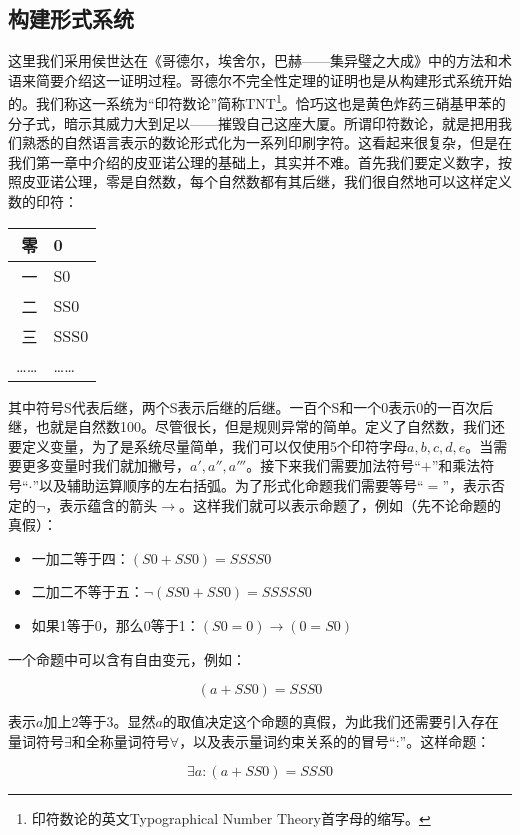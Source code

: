 \documentclass{article}
\begin{document}
\subsection{构建形式系统}
 
这里我们采用侯世达在《哥德尔，埃舍尔，巴赫——集异璧之大成》中的方法和术语来简要介绍这一证明过程。哥德尔不完全性定理的证明也是从构建形式系统开始的。我们称这一系统为“印符数论”简称TNT\footnote{印符数论的英文Typographical Number Theory首字母的缩写。}。恰巧这也是黄色炸药三硝基甲苯的分子式，暗示其威力大到足以——摧毁自己这座大厦。所谓印符数论，就是把用我们熟悉的自然语言表示的数论形式化为一系列印刷字符。这看起来很复杂，但是在我们第一章中介绍的皮亚诺公理的基础上，其实并不难。首先我们要定义数字，按照皮亚诺公理，零是自然数，每个自然数都有其后继，我们很自然地可以这样定义数的印符：

\begin{tabular}{|r|l|}
零 & 0 \\
\hline
一 & S0 \\
\hline
二 & SS0 \\
\hline
三 & SSS0 \\
\hline
…… & …… \\
\end{tabular}

其中符号S代表后继，两个S表示后继的后继。一百个S和一个0表示0的一百次后继，也就是自然数100。尽管很长，但是规则异常的简单。定义了自然数，我们还要定义变量，为了是系统尽量简单，我们可以仅使用5个印符字母$a, b, c, d, e$。当需要更多变量时我们就加撇号，$a', a'', a'''$。接下来我们需要加法符号“$+$”和乘法符号“$\cdot$”以及辅助运算顺序的左右括弧。为了形式化命题我们需要等号“$=$”，表示否定的$\lnot$，表示蕴含的箭头$\to$。这样我们就可以表示命题了，例如（先不论命题的真假）：

\begin{itemize}
\item 一加二等于四：$(S0 + SS0) = SSSS0$
\item 二加二不等于五：$\lnot (SS0 + SS0) = SSSSS0$
\item 如果1等于0，那么0等于1：$(S0 = 0) \to (0 = S0)$
\end{itemize}

一个命题中可以含有自由变元，例如：

\[
(a + SS0) = SSS0
\]

表示$a$加上2等于3。显然$a$的取值决定这个命题的真假，为此我们还需要引入存在量词符号$\exists$和全称量词符号$\forall$，以及表示量词约束关系的的冒号“:”。这样命题：

\[
\exists a : (a + SS0) = SSS0
\]
\end{document}
